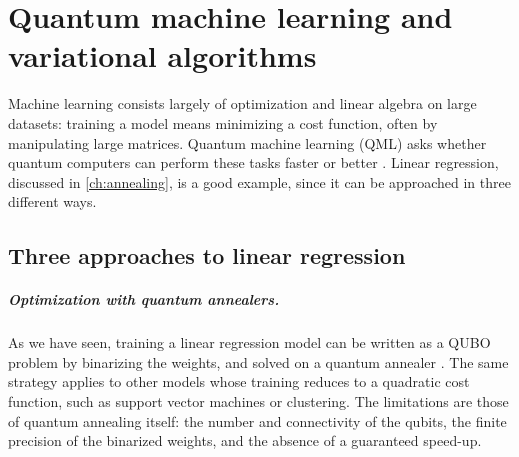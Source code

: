 \chapter[Quantum machine learning]{Quantum machine learning and variational algorithms}\label{ch:qml}

Machine learning consists largely of optimization and linear algebra on large datasets: training a model means minimizing a cost function, often by manipulating large matrices. Quantum machine learning (QML) asks
whether quantum computers can perform these tasks faster or better \cite{Biamonte2017}. Linear regression, discussed in \cref{ch:annealing}, is a good example, since it can be approached in three different ways.

\section{Three approaches to linear regression}
\paragraph{Optimization with quantum annealers.} As we have seen, training a linear regression model can be written as a QUBO problem by binarizing the weights, and solved on a quantum annealer \cite{DatePotok2021}.
The same strategy applies to other models whose training reduces to a quadratic cost function, such as support vector machines or clustering. The limitations are those of quantum annealing itself: the number and connectivity of
the qubits, the finite precision of the binarized weights, and the absence of a guaranteed speed-up.

